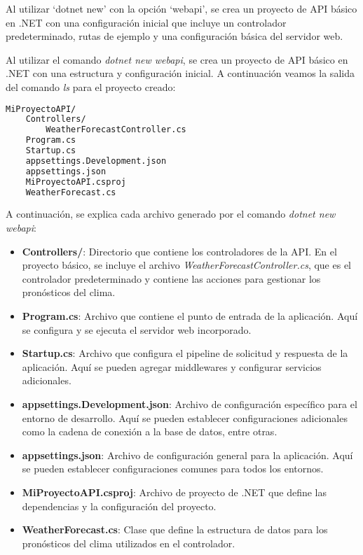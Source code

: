 \documentclass[executivepaper]{article}
\begin{document}
Al utilizar \enquote*{dotnet new} con la opción \enquote*{webapi}, se crea un proyecto de API básico en .NET con una configuración inicial que incluye un controlador predeterminado, rutas de ejemplo y una configuración básica del servidor web.

Al utilizar el comando \emph{dotnet new webapi}, se crea un proyecto de API básico en .NET con una estructura y configuración inicial. A continuación veamos la salida del comando \emph{ls} para el proyecto creado:

\begin{lstlisting}[language=bash]
MiProyectoAPI/
    Controllers/
        WeatherForecastController.cs
    Program.cs
    Startup.cs
    appsettings.Development.json
    appsettings.json
    MiProyectoAPI.csproj
    WeatherForecast.cs
\end{lstlisting}

A continuación, se explica cada archivo generado por el comando \emph{dotnet new webapi}:

\begin{itemize}
  \item \textbf{Controllers/}: Directorio que contiene los controladores de la API. En el proyecto básico, se incluye el archivo \emph{WeatherForecastController.cs}, que es el controlador predeterminado y contiene las acciones para gestionar los pronósticos del clima.

  \item \textbf{Program.cs}: Archivo que contiene el punto de entrada de la aplicación. Aquí se configura y se ejecuta el servidor web incorporado.

  \item \textbf{Startup.cs}: Archivo que configura el pipeline de solicitud y respuesta de la aplicación. Aquí se pueden agregar middlewares y configurar servicios adicionales.

  \item \textbf{appsettings.Development.json}: Archivo de configuración específico para el entorno de desarrollo. Aquí se pueden establecer configuraciones adicionales como la cadena de conexión a la base de datos, entre otras.

  \item \textbf{appsettings.json}: Archivo de configuración general para la aplicación. Aquí se pueden establecer configuraciones comunes para todos los entornos.

  \item \textbf{MiProyectoAPI.csproj}: Archivo de proyecto de .NET que define las dependencias y la configuración del proyecto.

  \item \textbf{WeatherForecast.cs}: Clase que define la estructura de datos para los pronósticos del clima utilizados en el controlador.

\end{itemize}
\end{document}
